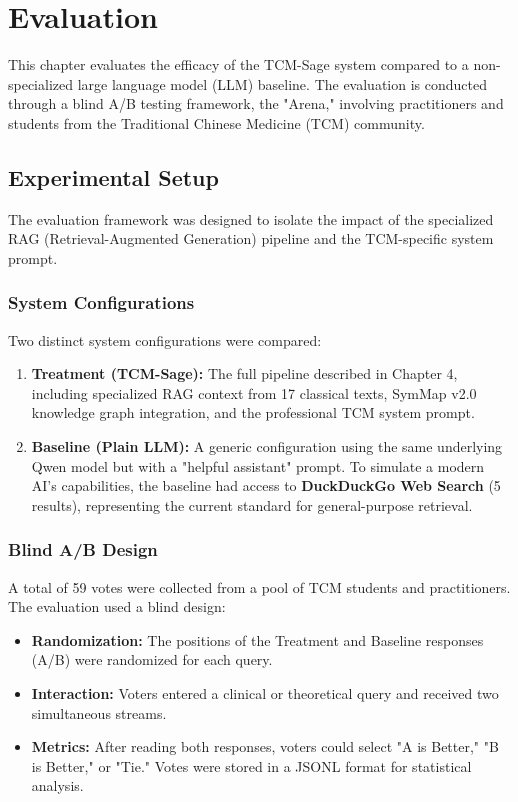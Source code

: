 \chapter{Evaluation}
\label{ch:evaluation}

This chapter evaluates the efficacy of the TCM-Sage system compared to a non-specialized large language model (LLM) baseline. The evaluation is conducted through a blind A/B testing framework, the "Arena," involving practitioners and students from the Traditional Chinese Medicine (TCM) community.

\section{Experimental Setup}

The evaluation framework was designed to isolate the impact of the specialized RAG (Retrieval-Augmented Generation) pipeline and the TCM-specific system prompt.

\subsection{System Configurations}
Two distinct system configurations were compared:
\begin{enumerate}
    \item \textbf{Treatment (TCM-Sage):} The full pipeline described in Chapter 4, including specialized RAG context from 17 classical texts, SymMap v2.0 knowledge graph integration, and the professional TCM system prompt.
    \item \textbf{Baseline (Plain LLM):} A generic configuration using the same underlying Qwen model but with a "helpful assistant" prompt. To simulate a modern AI's capabilities, the baseline had access to \textbf{DuckDuckGo Web Search} (5 results), representing the current standard for general-purpose retrieval.
\end{enumerate}

\subsection{Blind A/B Design}
A total of 59 votes were collected from a pool of TCM students and practitioners. The evaluation used a blind design:
\begin{itemize}
    \item \textbf{Randomization:} The positions of the Treatment and Baseline responses (A/B) were randomized for each query.
    \item \textbf{Interaction:} Voters entered a clinical or theoretical query and received two simultaneous streams.
    \item \textbf{Metrics:} After reading both responses, voters could select "A is Better," "B is Better," or "Tie." Votes were stored in a JSONL format for statistical analysis.
\end{itemize}

